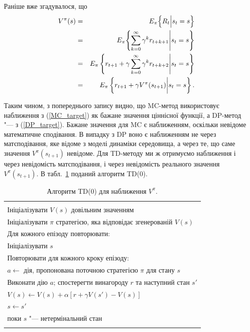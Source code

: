 Раніше вже згадувалося, що
\begin{eqnarray}
V^\pi(s) & = & E_\pi \Bigl\{R_t \Big| s_t = s \Bigr\} \label{MC_target}\\
			& = & E_\pi \Biggl\{\sum_{k=0}^{\infty}\gamma^k r_{t+k+1} \Bigg| s_t = s \Biggr\} \nonumber\\
			& = & E_\pi \left\{r_{t+1} + \gamma\sum_{k=0}^{\infty}\gamma^k r_{t+k+2} \Bigg| s_t = s \right\} \nonumber\\
			& = & E_\pi \left\{r_{t+1} + \gamma V^\pi(s_{t+1}) \bigg| s_t = s \right\}.\label{DP_target}
\end{eqnarray}

Таким чином, з попереднього запису видно, що MC-метод використовує наближення з (\ref{MC_target}) як бажане значення ціннісної функції, а DP-метод "--- з (\ref{DP_target}). Бажане значення для MC є наближенням, оскільки невідоме математичне сподівання. В випадку з DP воно є наближенням не через матсподівання, яке відоме з моделі динаміки середовища, а через те, що саме значення $V^\pi(s_{t+1})$ невідоме. Для TD-методу ми ж отримуємо наближення і через невідомість матсподівання, і через невідомість реального значення $V^\pi(s_{t+1})$. В табл.~\ref{TD0_algorithm} поданий алгоритм TD(0).

\begin{table}
\centering
\begin{tabular}{|l|}
\hline\\
Ініціалізувати $V(s)$ довільним значенням\\
Ініціалізувати $\pi$ стратегією, яка відповідає згенерованій $V(s)$\\
Для кожного епізоду повторювати:\\
\hspace{0.5cm} Ініціалізувати $s$\\
\hspace{0.5cm} Повторювати для кожного кроку епізоду:\\
\hspace{1cm} 	$a \leftarrow $ дія, пропонована поточною стратегією $\pi$ для стану $s$\\
\hspace{1cm} 	Виконати дію $a$; спостерегти винагороду $r$ та наступний стан $s'$\\
\hspace{1cm} 	$V(s) \leftarrow V(s) + \alpha\left[r + \gamma V(s') - V(s)\right]$\\
\hspace{1cm} 	$s \leftarrow s'$\\
\hspace{0.5cm} поки $s$ "--- нетермінальний стан\\
\\
\hline
\end{tabular}
\caption{Алгоритм TD(0) для наближення $V^\pi$.}
\label{TD0_algorithm}
\end{table}


